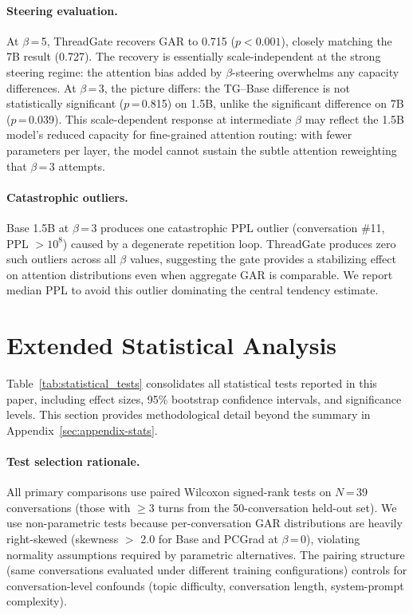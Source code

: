 \paragraph{Steering evaluation.} At $\beta$\,=\,5, ThreadGate recovers GAR to 0.715 ($p < 0.001$), closely matching the 7B result (0.727). The recovery is essentially scale-independent at the strong steering regime: the attention bias added by $\beta$-steering overwhelms any capacity differences. At $\beta$\,=\,3, the picture differs: the TG--Base difference is not statistically significant ($p$\,=\,0.815) on 1.5B, unlike the significant difference on 7B ($p$\,=\,0.039). This scale-dependent response at intermediate $\beta$ may reflect the 1.5B model's reduced capacity for fine-grained attention routing: with fewer parameters per layer, the model cannot sustain the subtle attention reweighting that $\beta$\,=\,3 attempts.

\paragraph{Catastrophic outliers.} Base 1.5B at $\beta$\,=\,3 produces one catastrophic PPL outlier (conversation \#11, PPL $> 10^8$) caused by a degenerate repetition loop. ThreadGate produces zero such outliers across all $\beta$ values, suggesting the gate provides a stabilizing effect on attention distributions even when aggregate GAR is comparable. We report median PPL to avoid this outlier dominating the central tendency estimate.



\section{Extended Statistical Analysis}\label{sec:appendix-stats-ext}

Table~\ref{tab:statistical_tests} consolidates all statistical tests reported in this paper, including effect sizes, 95\% bootstrap confidence intervals, and significance levels. This section provides methodological detail beyond the summary in Appendix~\ref{sec:appendix-stats}.

\paragraph{Test selection rationale.} All primary comparisons use paired Wilcoxon signed-rank tests on $N$\,=\,39 conversations (those with $\geq$3 turns from the 50-conversation held-out set). We use non-parametric tests because per-conversation GAR distributions are heavily right-skewed (skewness $>$ 2.0 for Base and PCGrad at $\beta$\,=\,0), violating normality assumptions required by parametric alternatives. The pairing structure (same conversations evaluated under different training configurations) controls for conversation-level confounds (topic difficulty, conversation length, system-prompt complexity).

